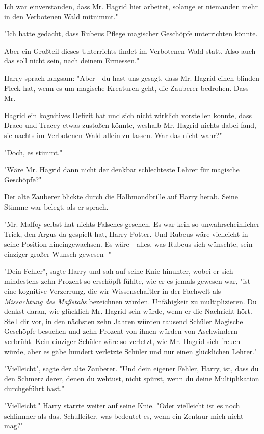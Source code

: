 {Ich war einverstanden, dass Mr. Hagrid hier arbeitet, solange er niemanden mehr in den Verbotenen Wald mitnimmt."

"Ich hatte gedacht, dass Rubeus Pflege magischer Geschöpfe unterrichten könnte.

Aber ein Großteil dieses Unterrichts findet im Verbotenen Wald statt. Also auch das soll nicht sein, nach deinem Ermessen."

Harry sprach langsam: "Aber - du hast uns gesagt, dass Mr. Hagrid einen blinden Fleck hat, wenn es um magische Kreaturen geht, die Zauberer bedrohen. Dass Mr.

Hagrid ein kognitives Defizit hat und sich nicht wirklich vorstellen konnte, dass Draco und Tracey etwas zustoßen könnte, weshalb Mr. Hagrid nichts dabei fand, sie nachts im Verbotenen Wald allein zu lassen. War das nicht wahr?"

"Doch, es stimmt."

"Wäre Mr. Hagrid dann nicht der denkbar schlechteste Lehrer für magische Geschöpfe?"

Der alte Zauberer blickte durch die Halbmondbrille auf Harry herab. Seine Stimme war belegt, als er sprach.

"Mr. Malfoy selbst hat nichts Falsches gesehen. Es war kein so unwahrscheinlicher Trick, den Argus da gespielt hat, Harry Potter. Und Rubeus wäre vielleicht in seine Position hineingewachsen. Es wäre - alles, was Rubeus sich wünschte, sein einziger großer Wunsch gewesen -"

"Dein Fehler", sagte Harry und sah auf seine Knie hinunter, wobei er sich mindestens zehn Prozent so erschöpft fühlte, wie er es jemals gewesen war, "ist eine kognitive Verzerrung, die wir Wissenschaftler in der Fachwelt als \emph{Missachtung des Maßstabs} bezeichnen würden. Unfähigkeit zu multiplizieren. Du denkst daran, wie glücklich Mr. Hagrid sein würde, wenn er die Nachricht hört. Stell dir vor, in den nächsten zehn Jahren würden tausend Schüler Magische Geschöpfe besuchen und zehn Prozent von ihnen würden von Aschwindern verbrüht. Kein einziger Schüler wäre so verletzt, wie Mr. Hagrid sich freuen würde, aber es gäbe hundert verletzte Schüler und nur einen glücklichen Lehrer."

"Vielleicht", sagte der alte Zauberer. "Und dein eigener Fehler, Harry, ist, dass du den Schmerz derer, denen du wehtust, nicht spürst, wenn du deine Multiplikation durchgeführt hast."

"Vielleicht." Harry starrte weiter auf seine Knie. "Oder vielleicht ist es noch schlimmer als das. Schulleiter, was bedeutet es, wenn ein Zentaur mich nicht mag?"

}
